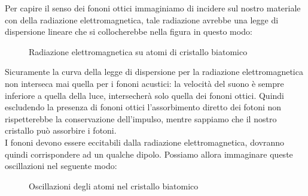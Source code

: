 Per capire il senso dei fononi ottici immaginiamo di incidere sul nostro materiale con della radiazione elettromagnetica, tale radiazione avrebbe una legge di dispersione lineare che si collocherebbe nella figura in questo modo:
\begin{figure}[H]
    \centering
    \caption{Radiazione elettromagnetica su atomi di cristallo biatomico}
    \label{fig:radiazione-elettromagnetica-su-atomi-di-cristallo-biatomico}
\end{figure}
\noindent
Sicuramente la curva della legge di dispersione per la radiazione elettromagnetica non interseca mai quella per i fononi acustici: la velocità del suono è sempre inferiore a quella della luce, intersecherà solo quella dei fononi ottici. 
Quindi escludendo la presenza di fononi ottici l'assorbimento diretto dei fotoni non rispetterebbe la conservazione dell'impulso, mentre sappiamo che il nostro cristallo può assorbire i fotoni.\\
I fononi devono essere eccitabili dalla radiazione elettromagnetica, dovranno quindi corrispondere ad un qualche dipolo. Possiamo allora immaginare queste oscillazioni nel seguente modo:
\begin{figure}[H]
    \centering
    \caption{Oscillazioni degli atomi nel cristallo biatomico}
    \label{fig:oscillazioni-degli-atomi-nel-cristallo-biatomico}
\end{figure}
\noindent
